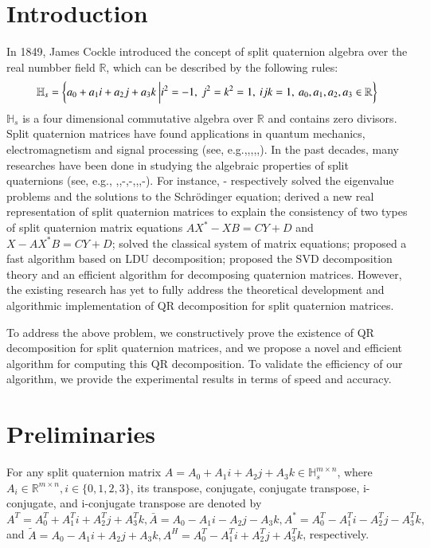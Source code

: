 \documentclass[3p]{elsarticle}
\numberwithin{equation}{section}
\begin{document}

\section{Introduction}
In 1849, James Cockle \cite{Cockle1849} introduced the concept of split quaternion algebra over the real numbber field $\mathbb{R}$,   which can be described by the following rules:
\begin{equation*}
    \small
    \mathbb{H}_s = \left\{ a_0 + a_1 i + a_2 j + a_3 k \ \bigg| i^2 = -1,\ j^2 = k^2 = 1, \ ijk = 1, \ a_0, a_1, a_2, a_3 \in \mathbb{R} \right\} 
\end{equation*} 
$\mathbb{H}_s$ is a four dimensional commutative algebra over $\mathbb{R}$ and contains zero divisors. 
Split quaternion matrices have found applications in quantum mechanics, electromagnetism and signal processing (see, e.g.,\cite{Gog2022},\cite{Hasebe2010},\cite{Le2022},\cite{Z2022},\cite{Wang2023}). In the past decades, many researches  have been done in studying the algebraic properties of split quaternions (see, e.g., \cite{Abłamowicz2020},\cite{Yasemin2012},\cite{TJiang2015}-\cite{TJiang2018},\cite{Zhuo2020}-\cite{Xin2019},\cite{mma},\cite{wang},\cite{Wang2021}-\cite{Zhang2015}). For instance, \cite{Jiang2018}-\cite{TJiang2018} respectively solved the eigenvalue problems and the solutions to the Schrödinger equation; \cite{Xin2019} derived a new real representation of split quaternion matrices to explain the consistency of two types of split quaternion matrix equations \(AX^* - XB = CY + D\) and \(X - AX^*B = CY + D\); \cite{wang} solved the classical system of matrix equations; \cite{Wang2021} proposed a fast algorithm based on LDU decomposition;  \cite{Gang2024}  proposed the SVD decomposition theory and an efficient algorithm for decomposing quaternion matrices. However, the existing research has yet to fully address the theoretical development and algorithmic implementation of QR decomposition for split quaternion matrices.

To address the above problem, we constructively prove the existence of QR decomposition for split quaternion matrices, and we propose a novel and efficient algorithm for computing this QR decomposition.  To validate the efficiency  of our algorithm, we provide the experimental results in terms of speed and accuracy.

\section{Preliminaries}
For any split quaternion matrix ${A}=A_{0}+A_{1}i + A_{2}j + A_{3}k \in\mathbb{H}_{s}^{m\times n}$, where $A_{i}\in\mathbb{R}^{m\times n}, i\in\{0,1,2,3\}$, its transpose, conjugate, conjugate transpose, i-conjugate, and i-conjugate transpose are  denoted by 
 ${A}^T = A_0^T + A_1^Ti + A_2^Tj + A_3^Tk,\bar{{A}} = A_0 - A_1i - A_2j - A_3k, {A}^* = A_0^T - A_1^Ti - A_2^Tj - A_3^Tk,$ and $\tilde{{A}} = A_0 - A_1i + A_2j + A_3k,{A}^H = A_0^T - A_1^Ti + A_2^Tj + A_3^Tk$, respectively.
\end{document}
